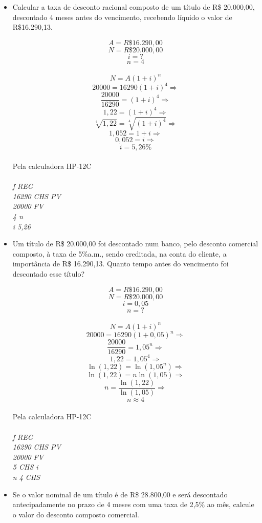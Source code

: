 \documentclass[a4paper, 12pt]{article}
\begin{document}
\begin{itemize}

\item Calcular a taxa de desconto racional composto de um título de R\$ 20.000,00, descontado  4  meses  antes  do  vencimento,  recebendo  líquido  o  valor  de  R\$16.290,13.
  
$$ A = R\$16.290,00 $$
$$ N = R\$20.000,00 $$
$$ i = ? $$
$$ n = 4 $$
\\
$$ N = A(1+i)^n $$
$$ 20000 = 16290(1+i)^{4} \Rightarrow $$
$$ \frac{20000}{16290} = (1+i)^{4}  \Rightarrow $$
$$ 1,22 = (1+i)^4  \Rightarrow $$
$$ \sqrt[4]{1,22} = \sqrt[4]{(1+i)^4}  \Rightarrow $$
$$ 1,052 = 1+i  \Rightarrow $$
$$ 0,052 = i  \Rightarrow $$
$$ \boxed{i = 5,26 \% } $$
\\
Pela calculadora HP-12C\\\\
\emph{f REG}\\
\emph{16290 CHS PV}\\
\emph{20000 FV}\\
\emph{4 n}\\
\emph{i 5,26}

\item Um  título  de  R\$  20.000,00  foi  descontado  num  banco,  pelo  desconto comercial composto, à taxa de 5\%a.m., sendo creditada, na conta do cliente, a importância  de  R\$  16.290,13.  Quanto  tempo  antes  do  vencimento  foi descontado esse título?
  
$$ A = R\$16.290,00 $$
$$ N = R\$20.000,00 $$
$$ i = 0,05 $$
$$ n = ? $$
\\
$$ N = A(1+i)^n $$
$$ 20000 = 16290(1+0,05)^{n} \Rightarrow $$
$$ \frac{20000}{16290} = 1,05^{n}  \Rightarrow $$
$$ 1,22 = 1,05^4  \Rightarrow $$
$$ \ln(1,22) = \ln(1,05^n)  \Rightarrow $$
$$ \ln(1,22) = n\ln(1,05) \Rightarrow $$
$$ n = \frac{\ln(1,22)}{\ln(1,05)} \Rightarrow $$
$$ \boxed{n \approx 4 } $$
\\
Pela calculadora HP-12C\\\\
\emph{f REG}\\
\emph{16290 CHS PV}\\
\emph{20000 FV}\\
\emph{5 CHS i}\\
\emph{n 4 CHS}  

\item Se o valor nominal de um título é de R\$ 28.800,00 e será descontado antecipadamente no prazo de 4 meses com uma taxa de 2,5\% ao mês, calcule o valor do desconto composto comercial.


\end{itemize}
\end{document}
